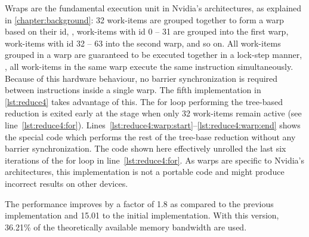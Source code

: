 Wraps are the fundamental execution unit in Nvidia's \GPU architectures, as explained in \autoref{chapter:background}:
32 work-items are grouped together to form a warp based on their id, \ie, work-items with id 0 -- 31 are grouped into the first warp, work-items with id 32 -- 63 into the second warp, and so on.
All work-items grouped in a warp are guaranteed to be executed together in a lock-step manner, \ie, all work-items in the same warp execute the same instruction simultaneously.
Because of this hardware behaviour, no barrier synchronization is required between instructions inside a single warp.
The fifth implementation in \autoref{lst:reduce4} takes advantage of this.
The for loop performing the tree-based reduction is exited early at the stage when only 32 work-items remain active (see line~\ref{lst:reduce4:for}).
Lines~\ref{lst:reduce4:warp:start}--\ref{lst:reduce4:warp:end} shows the special code which performs the rest of the tree-base reduction without any barrier synchronization.
The code shown here effectively unrolled the last six iterations of the for loop in line~\ref{lst:reduce4:for}.
As warps are specific to Nvidia's \GPU architectures, this implementation is not a portable \OpenCL code and might produce incorrect results on other \OpenCL devices.

The performance improves by a factor of 1.8 as compared to the previous implementation and 15.01 to the initial implementation.
With this version, 36.21\% of the theoretically available memory bandwidth are used.

